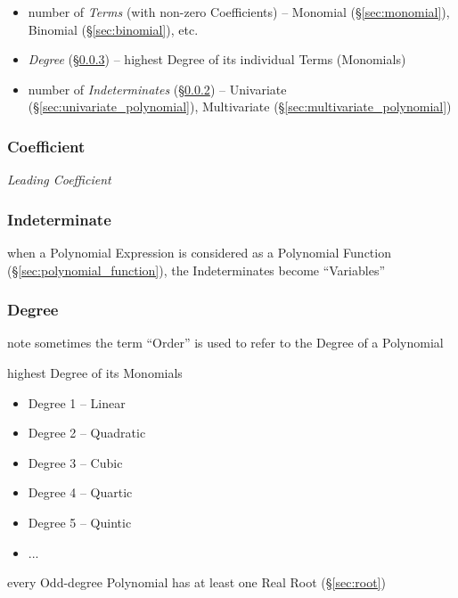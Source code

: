 \begin{itemize}
  \item number of \emph{Terms} (with non-zero Coefficients) -- Monomial
    (\S\ref{sec:monomial}), Binomial (\S\ref{sec:binomial}), etc.
  \item \emph{Degree} (\S\ref{sec:degree}) -- highest Degree of its individual
    Terms (Monomials)
  \item number of \emph{Indeterminates} (\S\ref{sec:indeterminate}) --
    Univariate (\S\ref{sec:univariate_polynomial}), Multivariate
    (\S\ref{sec:multivariate_polynomial})
\end{itemize}




\subsubsection{Coefficient}\label{sec:coefficient}

\emph{Leading Coefficient}



\subsubsection{Indeterminate}\label{sec:indeterminate}

when a Polynomial Expression is considered as a Polynomial Function
(\S\ref{sec:polynomial_function}), the Indeterminates become ``Variables''



\subsubsection{Degree}\label{sec:degree}

note sometimes the term ``Order'' is used to refer to the Degree of a
Polynomial

highest Degree of its Monomials

\begin{itemize}
  \item Degree 1 -- Linear
  \item Degree 2 -- Quadratic
  \item Degree 3 -- Cubic
  \item Degree 4 -- Quartic
  \item Degree 5 -- Quintic
  \item ...
\end{itemize}

every Odd-degree Polynomial has at least one Real Root
(\S\ref{sec:root})

